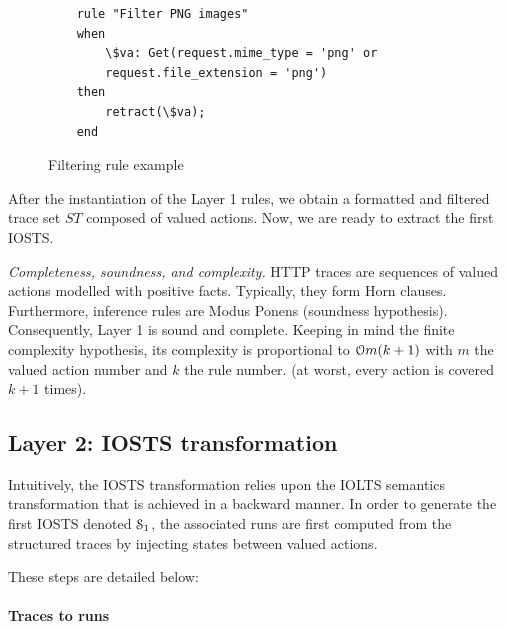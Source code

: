 \begin{figure}[ht]
    \begin{center}
    \begin{verbatim}
    rule "Filter PNG images"
    when
        \$va: Get(request.mime_type = 'png' or
        request.file_extension = 'png')
    then
        retract(\$va);
    end
    \end{verbatim}
    \end{center}

    \caption{Filtering rule example}
    \label{fig:layer1:filter}
\end{figure}

After the instantiation of the Layer 1 rules, we obtain a
formatted and filtered trace set $ST$ composed of valued actions.
Now, we are ready to extract the first IOSTS.

\textit{Completeness, soundness, and complexity.} HTTP traces are
sequences of valued actions modelled with positive facts.
Typically, they form Horn clauses. Furthermore, inference rules
are Modus Ponens (soundness hypothesis). Consequently, Layer 1 is
sound and complete. Keeping in mind the finite complexity
hypothesis, its complexity is proportional to
$\EuScript{O}m(k+1)$ with $m$ the valued action number and $k$
the rule number. (at worst, every action is covered $k+1$ times).

\subsection{Layer 2: IOSTS transformation}
\label{sec:modelinf:webapps:L2}

Intuitively, the IOSTS transformation relies upon the IOLTS
semantics transformation that is achieved in a backward manner.
In order to generate the first IOSTS denoted $\EuScript{S}_1$,
the associated runs are first computed from the structured traces
by injecting states between valued actions.

These steps are detailed below:

\paragraph{Traces to runs}

